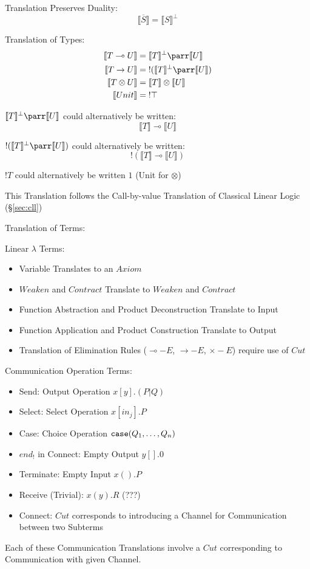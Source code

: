 Translation Preserves Duality:
\[
  \llbracket \overline{S} \rrbracket = \llbracket S \rrbracket^\bot
\]

Translation of Types:
\begin{align*}
  \llbracket T \multimap U \rrbracket &=
    \llbracket T \rrbracket^\bot \parr \llbracket U \rrbracket \\
  \llbracket T \rightarrow U \rrbracket &=
    \;!(\llbracket T \rrbracket^\bot \parr \llbracket U \rrbracket) \\
  \llbracket T \otimes U \rrbracket &=
    \llbracket T \rrbracket \otimes \llbracket U \rrbracket \\
  \llbracket Unit \rrbracket &= \;!\top
\end{align*}

$\llbracket T \rrbracket^\bot \parr \llbracket U \rrbracket$ could
alternatively be written:
\[
  \llbracket T \rrbracket \multimap \llbracket U \rrbracket
\]

$!(\llbracket T \rrbracket^\bot \parr \llbracket U \rrbracket)$ could
alternatively be written:
\[
  !(\llbracket T \rrbracket \multimap \llbracket U \rrbracket)
\]

$!T$ could alternatively be written $1$ (Unit for $\otimes$)

This Translation follows the Call-by-value Translation of Classical
Linear Logic (\S\ref{sec:cll})

Translation of Terms:

Linear $\lambda$ Terms:
\begin{itemize}
  \item Variable Translates to an $Axiom$
  \item $Weaken$ and $Contract$ Translate to $Weaken$ and $Contract$
  \item Function Abstraction and Product Deconstruction Translate to
    Input
  \item Function Application and Product Construction Translate to
    Output
  \item Translation of Elimination Rules ($\multimap-E$,
    $\rightarrow-E$, $\times-E$) require use of $Cut$
\end{itemize}

Communication Operation Terms:
\begin{itemize}
  \item Send: Output Operation $x[y].(P|Q)$
  \item Select: Select Operation $x[in_j].P$
  \item Case: Choice Operation $\mathtt{case}(Q_1, \ldots, Q_n)$
  \item $end_!$ in Connect: Empty Output $y[].0$
  \item Terminate: Empty Input $x().P$
  \item Receive (Trivial): $x(y).R$ (???)
  \item Connect: $Cut$ corresponds to introducing a Channel for
    Communication between two Subterms
\end{itemize}
Each of these Communication Translations involve a $Cut$ corresponding
to Communication with given Channel.


